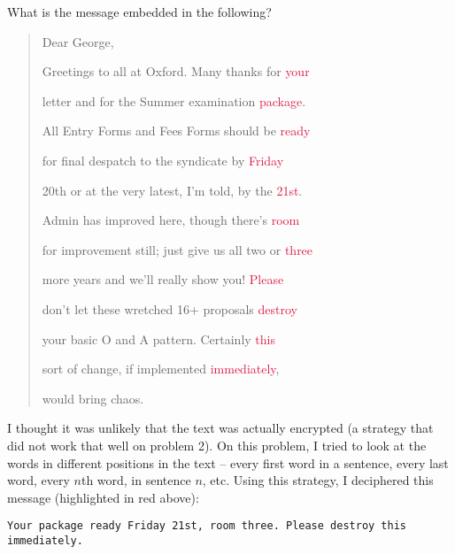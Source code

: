 \begin{problem}
What is the message embedded in the following?

\vspace{1ex}
\begin{quote}
\begin{sffamily}
\hspace{2.5ex}Dear George,

Greetings to all at Oxford.  Many thanks for \textcolor{crimson}{your}

letter and for the Summer examination \textcolor{crimson}{package}.

All Entry Forms and Fees Forms should be \textcolor{crimson}{ready}

for final despatch to the syndicate by \textcolor{crimson}{Friday}

20th or at the very latest, I'm told, by the \textcolor{crimson}{21st}.

Admin has improved here, though there's \textcolor{crimson}{room}

for improvement still; just give us all two or \textcolor{crimson}{three}

more years and we'll really show you! \textcolor{crimson}{Please}

don't let these wretched 16+ proposals \textcolor{crimson}{destroy}

your basic O and A pattern.  Certainly \textcolor{crimson}{this}

sort of change, if implemented \textcolor{crimson}{immediately},

would bring chaos.
\end{sffamily}
\end{quote}
\end{problem}

\begin{Answer}
  
I thought it was unlikely that the text was actually encrypted 
(a strategy that did not work that well on problem 2).
On this problem, I tried to look at the words in different positions in the text 
-- every first word in a sentence, every last word, every $n$th word, in sentence $n$, etc.
\newline
\noindent
Using this strategy, I deciphered this message (highlighted in red above):
\vspace{10pt}
\color{crimson}
\begin{verbatim}
Your package ready Friday 21st, room three. Please destroy this immediately.
\end{verbatim}
\end{Answer}

